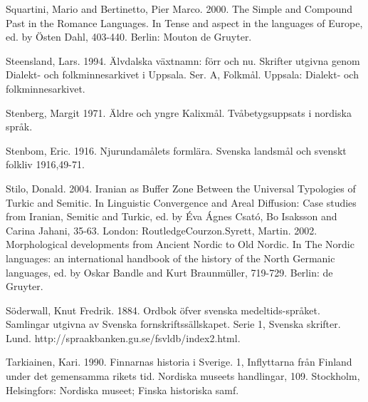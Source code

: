Squartini, Mario and Bertinetto, Pier Marco. 2000. The Simple and Compound Past in the Romance Languages. In Tense and aspect in the languages of Europe, ed. by Östen Dahl, 403-440. Berlin: Mouton de Gruyter.


Steensland, Lars. 1994. Älvdalska växtnamn: förr och nu. Skrifter utgivna genom Dialekt- och folkminnesarkivet i Uppsala. Ser. A, Folkmål. Uppsala: Dialekt- och folkminnesarkivet.


Stenberg, Margit 1971. Äldre och yngre Kalixmål. Tvåbetygsuppsats i nordiska språk.


Stenbom, Eric. 1916. Njurundamålets formlära. Svenska landsmål och svenskt folkliv 1916,49-71.


Stilo, Donald. 2004. Iranian as Buffer Zone Between the Universal Typologies of Turkic and Semitic. In Linguistic Convergence and Areal Diffusion: Case studies from Iranian, Semitic and Turkic, ed. by Éva Ágnes Csató, Bo Isaksson and Carina Jahani, 35-63. London: RoutledgeCourzon.Syrett, Martin. 2002. Morphological developments from Ancient Nordic to Old Nordic. In The Nordic languages: an international handbook of the history of the North Germanic languages, ed. by Oskar Bandle and Kurt Braunmüller, 719-729. Berlin: de Gruyter.


Söderwall, Knut Fredrik. 1884. Ordbok öfver svenska medeltids-språket. Samlingar utgivna av Svenska fornskriftssällskapet. Serie 1, Svenska skrifter. Lund. http://spraakbanken.gu.se/fsvldb/index2.html.


Tarkiainen, Kari. 1990. Finnarnas historia i Sverige. 1, Inflyttarna från Finland under det gemensamma rikets tid. Nordiska museets handlingar, 109. Stockholm, Helsingfors: Nordiska museet; Finska historiska samf.


